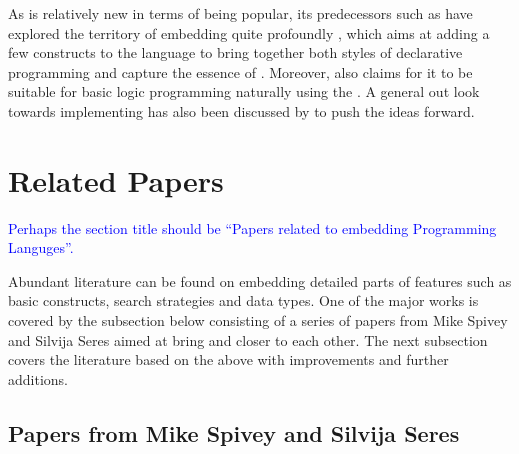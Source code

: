 \documentclass[thesis-solanki.tex]{subfiles}
\begin{document}
As  is relatively new in terms of being popular, its predecessors such as
 have
explored the territory of embedding  quite profoundly \cite{friedman05reasoned}, which aims at adding a few
constructs to the language to bring together both styles of declarative programming and capture the essence of
.
Moreover,  also claims for it to be suitable for basic logic programming naturally using the  \cite{website:logicprogexamplehaskell}.
A general out look towards implementing  has also been discussed by
\cite{krishnamurthi2007programming} to push the ideas forward.

\section{Related Papers}
\textcolor{blue}{Perhaps the section title should be ``Papers related to embedding Programming Languges''.}

Abundant literature
can be found on embedding detailed parts of  features
such as basic constructs, search strategies and data types.
One of the major works is covered by the subsection below consisting of a series of papers from Mike Spivey and
Silvija Seres aimed at bring  and  closer to each other.
The next subsection covers the literature based on the above
with improvements and further additions.


\subsection{Papers from Mike Spivey and Silvija Seres}
\end{document}
